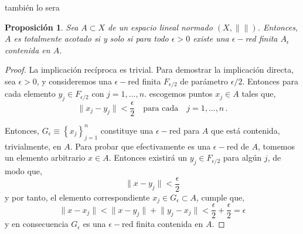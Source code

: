 \documentclass[12pt]{book}
\newtheorem{prop}{\bf Proposición}[chapter]
\newcommand{\norm}[1]{\lVert #1\rVert }
\begin{document}
 también lo sera  
\begin{prop} Sea $A\subset X$ de un espacio lineal normado $(X,\norm{})$. Entonces, $A$ es 
totalmente acotado si y solo si para todo  $\epsilon>0$ existe una $\epsilon-$red finita $A_\epsilon$ 
contenida en $A$.
\end{prop}
\begin{proof}
 La implicación recíproca es trivial. Para demostrar la implicación directa, sea $\epsilon>0$, y 
consideremos una $\epsilon-$red finita $F_{\epsilon/2}$ de parámetro $\epsilon/2$. Entonces para 
cada elemento $y_j\in F_{\epsilon/2}$ con $j=1,\dots,n$. escogemos puntos $x_j\in A$  tales que,
 $$\norm{x_j-y_j}<\frac{\epsilon}{2}\quad\text{para cada} \quad j=1,\dots,n\,.$$
 
 Entonces, $G_\epsilon\equiv\left\{x_j\right\}_{j=1}^n$ constituye una $\epsilon-$red para $A$ que 
está contenida, trivialmente,  en $A$. Para probar que efectivamente es una $\epsilon-$red de $A$, 
tomemos un elemento arbitrario $x\in A$. Entonces existirá un $y_j\in F_{\epsilon/2}$ para algún 
$j$, de modo que,
$$\norm{x-y_j}<\frac{\epsilon}{2}$$
y por tanto, el elemento correspondiente $x_j\in G_\epsilon\subset A$, cumple que,
$$\norm{x-x_j}<\norm{x -y_j}+\norm{y_j-x_j}<\frac{\epsilon}{2} +\frac{\epsilon}{2}=\epsilon$$
 y en  consecuencia $G_\epsilon$ es una $\epsilon-$red finita contenida en $A$.
\end{proof}
\end{document}
